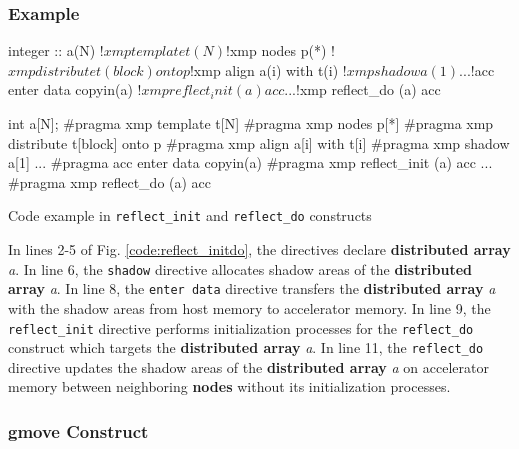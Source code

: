 \subsubsection*{Example}
\begin{myfigure}
\begin{minipage}{0.45\hsize}
\begin{center}
\begin{XACCFexampleL}
integer :: a(N)
!$xmp template t(N)
!$xmp nodes p(*)
!$xmp distribute t(block) onto p
!$xmp align a(i) with t(i)
!$xmp shadow a(1)
...
!$acc enter data copyin(a)
!$xmp reflect_init (a) acc
...
!$xmp reflect_do (a) acc
\end{XACCFexampleL}
\end{center}
\end{minipage}
%
\begin{minipage}{0.53\hsize}
\begin{center}
\begin{XACCCexampleR}
int a[N];
#pragma xmp template t[N]
#pragma xmp nodes p[*]
#pragma xmp distribute t[block] onto p
#pragma xmp align a[i] with t[i]
#pragma xmp shadow a[1]
...
#pragma acc enter data copyin(a)
#pragma xmp reflect_init (a) acc
...
#pragma xmp reflect_do (a) acc
\end{XACCCexampleR}
\end{center}
\end{minipage}
\caption{Code example in {\tt reflect\_init} and {\tt reflect\_do} constructs}\label{code:reflect_initdo}
\end{myfigure}

In lines 2-5 of Fig. \ref{code:reflect_initdo},
the directives declare {\bf distributed array} {\it a}.
In line 6,
the {\tt shadow} directive allocates shadow areas of the {\bf distributed array} {\it a}.
In line 8,
the {\tt enter data} directive transfers the {\bf distributed array} {\it a} with the shadow areas from host memory to accelerator memory.
In line 9,
the {\tt reflect\_init} directive performs initialization processes for the {\tt reflect\_do} construct which targets the {\bf distributed array} {\it a}.
In line 11,
the {\tt reflect\_do} directive updates the shadow areas of the {\bf distributed array} {\it a} on accelerator memory between neighboring {\bf nodes}
without its initialization processes.

\subsubsection{gmove Construct}\label{sec:gmove}
